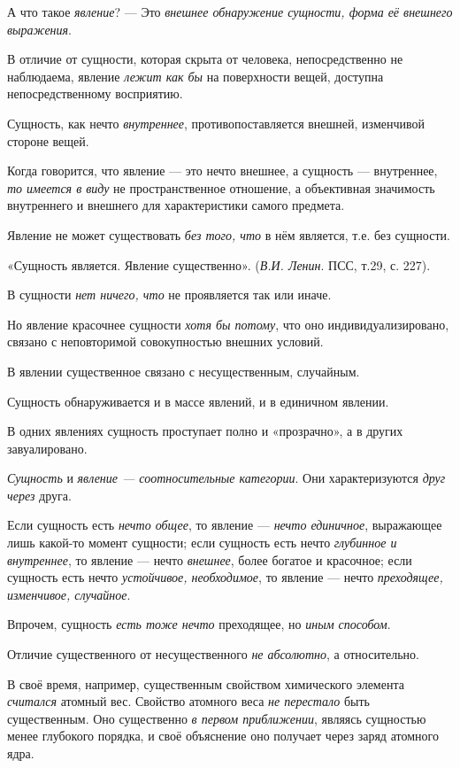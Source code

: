 \documentclass[a4paper,14pt,russian]{extreport}
\begin{document}
А что такое \emph{явление}? --- Это \emph{внешнее обнаружение сущности, форма её внешнего выражения}.

В отличие от сущности, которая скрыта от человека, непосредственно не наблюдаема, явление \emph{лежит как бы} на поверхности вещей, доступна непосредственному восприятию.

Сущность, как нечто \emph{внутреннее}, противопоставляется внешней, изменчивой стороне вещей.

Когда говорится, что явление --- это нечто внешнее, а сущность --- внутреннее, \emph{то имеется в виду} не пространственное отношение, а объективная значимость внутреннего и внешнего для характеристики самого предмета.

Явление не может существовать \emph{без того, что} в нём является, т.е. без сущности.

«Сущность является. Явление существенно». (\emph{В.И. Ленин}. ПСС, т.29, с. 227).

В сущности \emph{нет ничего, что} не проявляется так или иначе.

Но явление красочнее сущности \emph{хотя бы потому}, что оно индивидуализировано, связано с неповторимой совокупностью внешних условий.

В явлении существенное связано с несущественным, случайным.

Сущность обнаруживается и в массе явлений, и в единичном явлении.

В одних явлениях сущность проступает полно и «прозрачно», а в других завуалировано.

\emph{Сущность} и \emph{явление --- соотносительные категории}. Они характеризуются \emph{друг через} друга.

Если сущность есть \emph{нечто общее}, то явление --- \emph{нечто единичное}, выражающее лишь какой-то момент сущности; если сущность есть нечто \emph{глубинное и внутреннее}, то явление --- нечто \emph{внешнее}, более богатое и красочное; если сущность есть нечто \emph{устойчивое, необходимое}, то явление --- нечто \emph{преходящее, изменчивое, случайное}.

Впрочем, сущность \emph{есть тоже нечто} преходящее, но \emph{иным способом}.

Отличие существенного от несущественного \emph{не абсолютно}, а относительно.

В своё время, например, существенным свойством химического элемента \emph{считался} атомный вес. Свойство атомного веса \emph{не перестало} быть существенным. Оно существенно \emph{в первом приближении}, являясь сущностью менее глубокого порядка, и своё объяснение оно получает через заряд атомного ядра.
\end{document}

